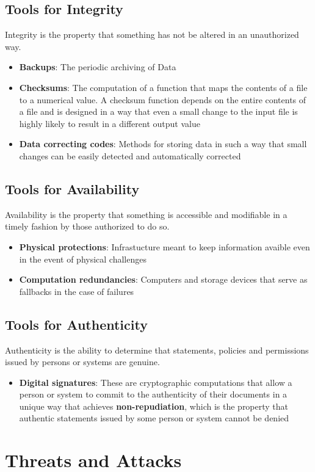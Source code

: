 \documentclass{article}
\begin{document}
\subsection{Tools for Integrity}

Integrity is the property that something has not be altered in an unauthorized way.

\begin{itemize}
    \item \textbf{Backups}: The periodic archiving of Data
    \item \textbf{Checksums}: The computation of a function that maps the contents of a file 
    to a numerical value. A checksum function depends on the entire contents of a file
    and is designed in a way that even a small change to the input file is highly likely
    to result in a different output value
    \item \textbf{Data correcting codes}: Methods for storing data in such a way
    that small changes can be easily detected and automatically corrected 
\end{itemize}

\subsection{Tools for Availability}

Availability is the property that something is accessible and 
modifiable in a timely fashion by those authorized to do so.

\begin{itemize}
    \item \textbf{Physical protections}: Infrastucture meant to keep information avaible even in the event of physical challenges
    \item \textbf{Computation redundancies}: Computers and storage devices that serve as fallbacks in the case of failures 
\end{itemize}

\subsection{Tools for Authenticity}

Authenticity is the ability to determine that statements, policies and permissions issued by persons or systems are genuine.
 
\begin{itemize}
    \item \textbf{Digital signatures}: These are cryptographic computations that allow a person or system
    to commit to the authenticity of their documents in a unique way that achieves \textbf{non-repudiation}, which is the property 
    that authentic statements issued by some person or system cannot be denied 
\end{itemize}

\section{Threats and Attacks}
\end{document}

